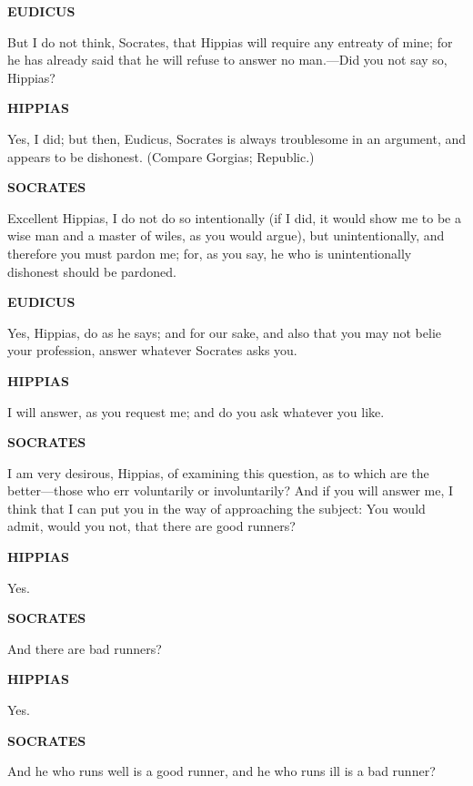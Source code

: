 \documentclass[11pt,letter]{article}
\begin{document}
\par \textbf{EUDICUS}
\par   But I do not think, Socrates, that Hippias will require any entreaty of mine; for he has already said that he will refuse to answer no man.—Did you not say so, Hippias?

\par \textbf{HIPPIAS}
\par   Yes, I did; but then, Eudicus, Socrates is always troublesome in an argument, and appears to be dishonest. (Compare Gorgias; Republic.)

\par \textbf{SOCRATES}
\par   Excellent Hippias, I do not do so intentionally (if I did, it would show me to be a wise man and a master of wiles, as you would argue), but unintentionally, and therefore you must pardon me; for, as you say, he who is unintentionally dishonest should be pardoned.

\par \textbf{EUDICUS}
\par   Yes, Hippias, do as he says; and for our sake, and also that you may not belie your profession, answer whatever Socrates asks you.

\par \textbf{HIPPIAS}
\par   I will answer, as you request me; and do you ask whatever you like.

\par \textbf{SOCRATES}
\par   I am very desirous, Hippias, of examining this question, as to which are the better—those who err voluntarily or involuntarily? And if you will answer me, I think that I can put you in the way of approaching the subject:  You would admit, would you not, that there are good runners?

\par \textbf{HIPPIAS}
\par   Yes.

\par \textbf{SOCRATES}
\par   And there are bad runners?

\par \textbf{HIPPIAS}
\par   Yes.

\par \textbf{SOCRATES}
\par   And he who runs well is a good runner, and he who runs ill is a bad runner?
\end{document}
